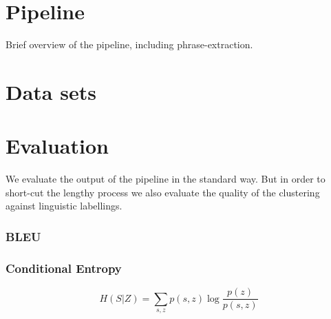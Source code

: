 \section{Pipeline}

Brief overview of the pipeline, including phrase-extraction.

\section{Data sets}

\section{Evaluation}

We evaluate the output of the pipeline in the standard way. But in order to short-cut the lengthy process we also evaluate the quality of the clustering against linguistic labellings.

\subsubsection{BLEU}

\subsubsection{Conditional Entropy}

\[ H(S|Z) = \sum_{s,z} p(s,z) \log \frac{p(z)}{p(s,z)} \]

